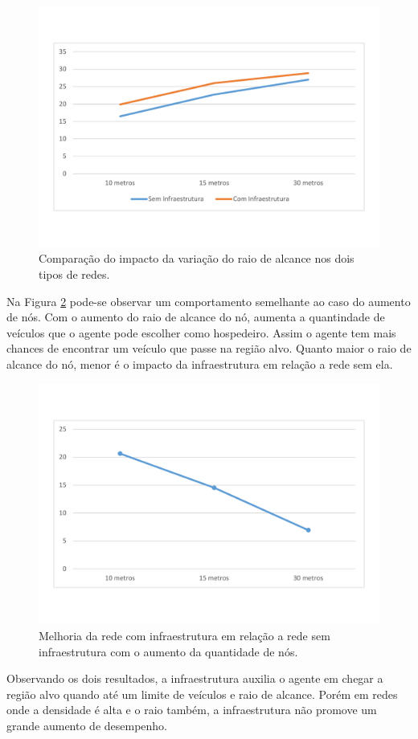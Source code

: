 \begin{figure}[htbp]
	\centering
	\includegraphics[scale=0.34]{resultados/graficos/comparacaoVariacaoRaioAlcance.pdf}
	\caption{Comparação do impacto da variação do raio de alcance nos dois tipos de redes.}
	\label{fig:comparacaoVariacaoRaioAlcance}
\end{figure}

Na Figura \ref{fig:comparacaoMelhoriaComVariacaoRaioAlcance} pode-se observar um comportamento semelhante ao caso do aumento de nós. Com o aumento do raio de alcance do nó, aumenta a quantindade de veículos que o agente pode escolher como hospedeiro. Assim o agente tem mais chances de encontrar um veículo que passe na região alvo. Quanto maior o raio de alcance do nó, menor é o impacto da infraestrutura em relação a rede sem ela.

\begin{figure}[htbp]
	\centering
	\includegraphics[scale=0.34]{resultados/graficos/comparacaoMelhoriaComVariacaoRaioAlcance.pdf}
	\caption{Melhoria da rede com infraestrutura em relação a rede sem infraestrutura com o aumento da quantidade de nós.}
	\label{fig:comparacaoMelhoriaComVariacaoRaioAlcance}
\end{figure}

Observando os dois resultados, a infraestrutura auxilia o agente em chegar a região alvo quando até um limite de veículos e raio de alcance. Porém em redes onde a densidade é alta e o raio também, a infraestrutura não promove um grande aumento de desempenho.
